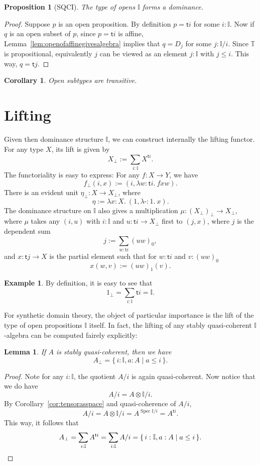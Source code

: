 \documentclass[12pt]{amsart}
\newtheorem{lemma}[theorem]{Lemma}
\newtheorem{corollary}[theorem]{Corollary}
\newtheorem{proposition}[theorem]{Proposition}
\theoremstyle{definition}
\newtheorem{example}[theorem]{Example}
\newcommand{\mbb}[1]{\mathbb{#1}}
\newcommand{\T}{\mbb T}
\newcommand{\I}{\mbb I}
\newcommand{\ms}[1]{\mathsf{#1}}
\newcommand{\scomp}[2]{\{\,#1\mid#2\,\}}
\newcommand{\prt}{_{\bot}}
\newcommand{\ld}[2]{\lambda #1\!\colon\!\!#2.\ }
\newcommand{\hp}{\text{-}}
\newcommand{\spec}{\operatorname{Spec}}
\begin{document}
\begin{proposition}[SQCI]\label{prop:Idominance}
  The type of opens $\I$ forms a dominance.
\end{proposition}
\begin{proof}
  Suppose $p$ is an open proposition. By definition $p = \ms ti$ for some $i:\I$. Now if $q$ is an open subset of $p$, since $p = \ms ti$ is affine, Lemma~\ref{lem:openofaffinegivesalgebra} implies that $q = D_j$ for some $j : \I/i$. Since $\T$ is propositional, equivalently $j$ can be viewed as an element $j : \I$ with $j \le i$. This way, $q = \ms tj$.
\end{proof}

\begin{corollary}\label{cor:opentransitive}
  Open subtypes are transitive.
\end{corollary}


\section{Lifting}\label{sec:lifting}

Given then dominance structure $\I$, we can construct internally the lifting functor. For any type $X$, its lift is given by
\[ X\prt := \sum_{i:\I}X^{\ms ti}. \]
The functoriality is easy to express: For any $f : X \to Y$, we have
\[ f\prt(i,x) := (i,\ld{w}{\ms ti}fxw). \]
There is an evident unit $\eta\prt : X \to X\prt$, where
\[ \eta := \ld x X(1,\ld\hp 1 x). \]
The dominance structure on $\I$ also gives a multiplication $\mu : (X\prt)\prt \to X\prt$, where $\mu$ takes any $(i,u)$ with $i : \I$ and $u : \ms ti \to X\prt$ first to $(j,x)$, where $j$ is the dependent sum
\[ j := \sum_{w:\ms ti} (uw)_0, \]
and $x : \ms tj \to X$ is the partial element such that for $w : \ms ti$ and $v : (uw)_0$
\[ x(w,v) := (uw)_1(v). \]

\begin{example}
  By definition, it is easy to see that
  \[ 1\prt = \sum_{i:\I}\ms ti = \I. \]
\end{example}

For synthetic domain theory, the object of particular importance is the lift of the type of open propositions $\I$ itself. In fact, the lifting of any stably quasi-coherent $\I$-algebra can be computed fairely explicitly:

\begin{lemma}\label{lem:liftingofalgebra}
  If $A$ is stably quasi-coherent, then we have
  \[ A\prt = \scomp{i : \I, a : A}{a \le i}. \]
\end{lemma}
\begin{proof}
  Note for any $i : \I$, the quotient $A/i$ is again quasi-coherent. Now notice that we do have
  \[ A/i = A \otimes \I/i. \]
  By Corollary~\ref{cor:tensorasspace} and quasi-coherence of $A/i$, 
  \[ A/i = A \otimes \I/i = A^{\spec \I/i} = A^{\ms ti}. \]
  This way, it follows that 
  \[ A\prt = \sum_{i:\I}A^{\ms ti} = \sum_{i:\I}A/i = \scomp{i : \I, a : A}{a \le i}. \qedhere \]
\end{proof}
\end{document}
